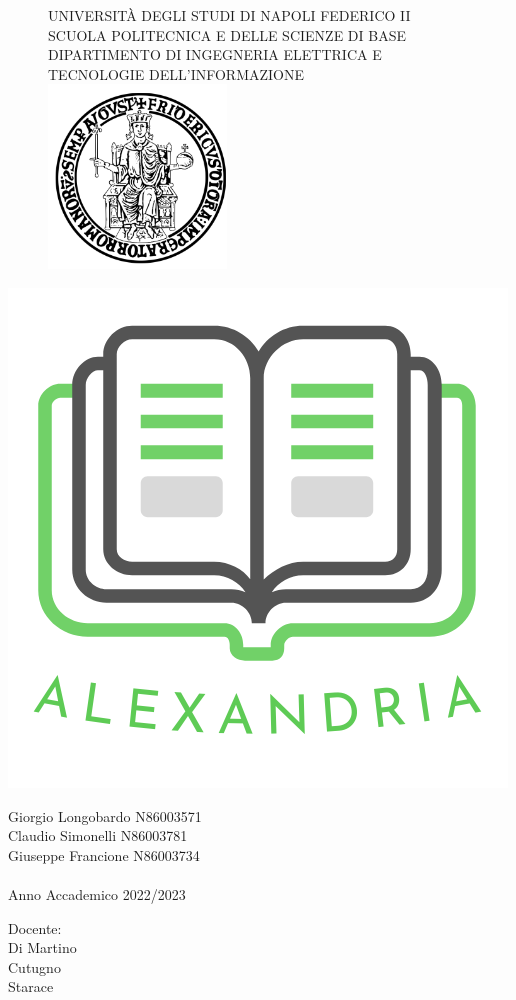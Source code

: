 \documentclass{report}
\begin{document}
    \begin{figure}[htbp!]
        \begin{center}
                UNIVERSITÀ DEGLI STUDI DI NAPOLI FEDERICO II \\
                SCUOLA POLITECNICA E DELLE SCIENZE DI BASE\\
                DIPARTIMENTO DI INGEGNERIA ELETTRICA E TECNOLOGIE DELL'INFORMAZIONE\\
            \includegraphics[width=.30\textwidth]{Immagini/FedericoII.png}
        \end{center}
    \end{figure}
         \begin{center}
            \includegraphics[width=.30\textwidth]{Immagini/Alexandria logo nome medium 2.png} 
        \end{center}
        

    \begin{center}


        Giorgio Longobardo N86003571 \\ Claudio Simonelli N86003781\\ Giuseppe Francione N86003734\\~\\ Anno Accademico 2022/2023
    \end{center}
    
\hspace{0pt}
\vfill
    \raggedleft Docente:\\Di Martino\\Cutugno\\Starace
\vfill
\hspace{0pt}


    
    \newpage

    \tableofcontents

    
    
    
    
    
    
    

    
\end{document}
